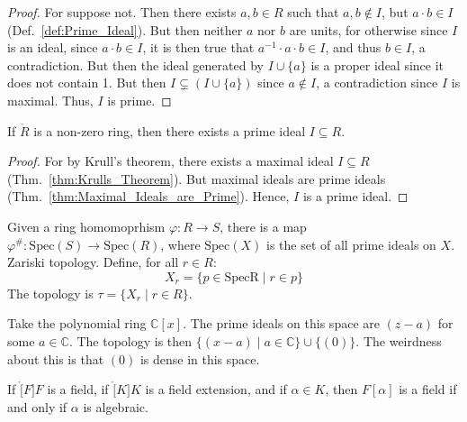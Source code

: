     \begin{proof}
        For suppose not. Then there exists $a,b\in{R}$ such that
        $a,b\notin{I}$, but $a\cdot{b}\in{I}$ (Def.~\ref{def:Prime_Ideal}).
        But then neither $a$ nor $b$ are units, for otherwise since $I$ is
        an ideal, since $a\cdot{b}\in{I}$, it is then true that
        $a^{\minus{1}}\cdot{a}\cdot{b}\in{I}$, and thus $b\in{I}$, a
        contradiction. But then the ideal generated by $I\cup\{a\}$ is a
        proper ideal since it does not contain 1. But then
        $I\subsetneq(I\cup\{a\})$ since $a\notin{I}$, a contradiction since
        $I$ is maximal. Thus, $I$ is prime.
    \end{proof}
    \begin{theorem}
        \label{thm:Existence_of_Prime_Ideals}%
        If $\ring{R}$ is a non-zero ring, then there exists a prime ideal
        $I\subseteq{R}$.
    \end{theorem}
    \begin{proof}
        For by Krull's theorem, there exists a maximal ideal
        $I\subseteq{R}$ (Thm.~\ref{thm:Krulls_Theorem}). But maximal ideals
        are prime ideals (Thm.~\ref{thm:Maximal_Ideals_are_Prime}). Hence,
        $I$ is a prime ideal.
    \end{proof}
    Given a ring homomoprhism $\varphi:R\rightarrow{S}$, there is a map
    $\varphi^{\#}:\textrm{Spec}(S)\rightarrow\textrm{Spec}(R)$, where
    $\textrm{Spec}(X)$ is the set of all prime ideals on $X$.
    Zariski topology. Define, for all $r\in{R}$:
    \begin{equation}
        X_{r}=\{p\in\textrm{Spec{R}}\;|\;r\in{p}\}
    \end{equation}
    The topology is $\tau=\{X_{r}\;|\;r\in{R}\}$.
    \begin{example}
        Take the polynomial ring $\mathbb{C}[x]$. The prime ideals on this
        space are $(z-a)$ for some $a\in\mathbb{C}$. The topology is then
        $\{(x-a)\;|\;a\in\mathbb{C}\}\cup\{(0)\}$. The weirdness about this
        is that $(0)$ is dense in this space.
    \end{example}
    \begin{theorem}
        If $\ring[F]{F}$ is a field, if $\ring[K]{K}$ is a field extension,
        and if $\alpha\in{K}$, then $F[\alpha]$ is a field if and only if
        $\alpha$ is algebraic. 
    \end{theorem}
    \begin{theorem}
    \end{theorem}
